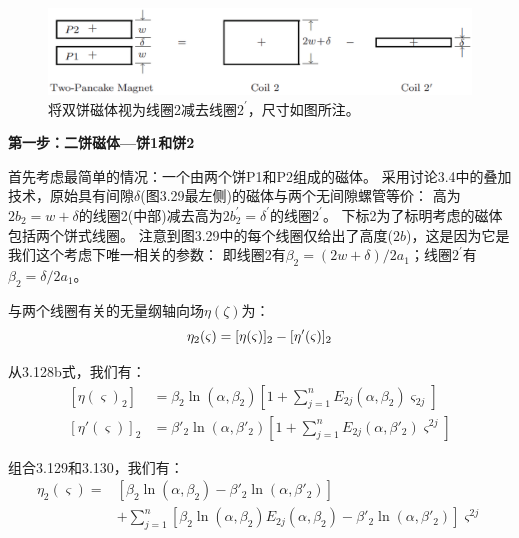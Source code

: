 \begin{figure}[htbp]
	\centering
	\includegraphics[scale=0.5]{chpt3/figs/fig3.29.eps}
	\caption{将双饼磁体视为线圈2减去线圈$2^\prime$，尺寸如图所注。}
\end{figure}

\textbf{第一步：二饼磁体---饼1和饼2}

首先考虑最简单的情况：一个由两个饼P1和P2组成的磁体。
采用讨论3.4中的叠加技术，原始具有间隙$\delta$(图3.29最左侧)的磁体与两个无间隙螺管等价：
高为$2b_2 = w +\delta$的线圈2(中部)减去高为$2b_2^\prime = \delta^\prime$的线圈$2^\prime$。
下标2为了标明考虑的磁体包括两个饼式线圈。
注意到图3.29中的每个线圈仅给出了高度($2b$)，这是因为它是我们这个考虑下唯一相关的参数：
即线圈2有$\beta_2=(2w+\delta)/2a_1$；线圈$2^\prime$有$\beta_2=\delta/2a_1$。

与两个线圈有关的无量纲轴向场$\eta(\zeta)$为：
\begin{equation}
\eta_{2}(\varsigma)=[\eta(\varsigma)]_{2}-[\eta'(\varsigma)]_{2}\\%
\end{equation}

从3.128b式，我们有：
\begin{subequations}
	\begin{align}
{[\eta(\varsigma)_{2}]}&=\beta_{2}\ln(\alpha,\beta_{2})\left[1+\sum_{j=1}^{n}E_{2j}(\alpha,\beta_{2})\varsigma_{2j}\right]\\
{[\eta'(\varsigma)]}_{2}&=\beta'_{2}\ln(\alpha,\beta'_{2})\left[1+\sum_{j=1}^{n}E_{2j}(\alpha,\beta'_{2})\varsigma^{2j}\right]%
	\end{align}
\end{subequations}

组合3.129和3.130，我们有：
\begin{equation}
\begin{split}
\eta_{2}(\varsigma)=&[\beta_{2}\ln(\alpha,\beta_{2})-\beta'_{2}\ln(\alpha,\beta'_{2})]\\
&+\sum_{j=1}^{n}[\beta_{2}\ln(\alpha,\beta_{2})E_{2j}(\alpha,\beta_{2})-\beta'_{2}\ln(\alpha,\beta'_{2})]\varsigma^{2j}%
\end{split}
\end{equation}

